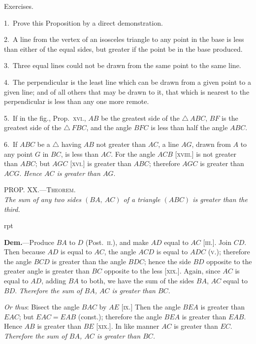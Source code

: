 \documentclass[oneside]{book}
\newcounter{wrapwidth}
\newcommand\myprop[2]{
\bigskip\Needspace*{4\baselineskip}\begin{center}\textsc{#1}\\\medskip\emph{#2}\par\end{center}
}
\newcommand\exhead[1]{
\Needspace*{5\baselineskip}\begin{center}
\textsf{#1}
\end{center}
}
\newcommand\imgflow[3]{
\setcounter{wrapwidth}{#1}

\begin{wrapfigure}[#2]{r}{\value{wrapwidth}pt}
\begin{center}
\vspace{-0.3in}

\end{center}
\end{wrapfigure}
}
\begin{document}
\exhead{Exercises.}

\begin{footnotesize}
1.~Prove this Proposition by a direct demonstration.

2.~A line from the vertex of an isosceles triangle to any point
in the base is less than either of the equal sides, but greater if the
point be in the base produced.

3.~Three equal lines could not be drawn from the same point
to the same line.

4.~The perpendicular is the least line which can be drawn from
a given point to a given line; and of all others that may be
drawn to it, that which is nearest to the perpendicular is less
than any one more remote.

5.~If in the fig., Prop.~\textsc{xvi}., $AB$ be the greatest side of the
$\triangle~ABC$, $BF$ is the greatest side of the $\triangle~FBC$, and the angle $BFC$
is less than half the angle $ABC$.

6.~If $ABC$ be a $\triangle$ having $AB$ not greater than $AC$, a line $AG$,
drawn from $A$ to any point $G$ in $BC$, is less than $AC$. For the
angle $ACB$ [\textsc{xviii}.] is not greater than $ABC$; but $AGC$ [\textsc{xvi}.] is
greater than $ABC$; therefore $AGC$ is greater than $ACG$. \emph{Hence
$AC$ is greater than $AG$}.
\par\end{footnotesize}



\myprop{PROP\@. XX\@.---Theorem.}{The sum of any two sides $(BA,\ AC)$ of a triangle $(ABC)$
is greater than the third.}


\imgflow{150}{10}{f036}

\textbf{Dem.}---Produce $BA$ to $D$ (Post.~\textsc{ii}.), and make $AD$
equal to $AC$ [\textsc{iii}.]. Join
$CD$. Then because $AD$ is
equal to $AC$, the angle
$ACD$ is equal to $ADC$ (\textsc{v}.);
therefore the angle $BCD$
is greater than the angle
$BDC$; hence the side $BD$
opposite to the greater angle
is greater than $BC$ opposite
to the less [\textsc{xix}.]. Again,
since $AC$ is equal to $AD$,
adding $BA$ to both, we have the sum of the sides $BA$,
$AC$ equal to $BD$. \emph{Therefore the sum of $BA$, $AC$ is
greater than $BC$.}

\begin{footnotesize}
\emph{Or thus}: Bisect the angle $BAC$ by $AE$ [\textsc{ix}.] Then the angle
$BEA$ is greater than $EAC$; but $EAC = EAB$ (const.); therefore
the angle $BEA$ is greater than $EAB$. Hence $AB$ is greater than
$BE$ [\textsc{xix}.]. In like manner $AC$ is greater than $EC$. \emph{Therefore
the sum of $BA$, $AC$ is greater than $BC$.}
\par\end{footnotesize}
\end{document}
